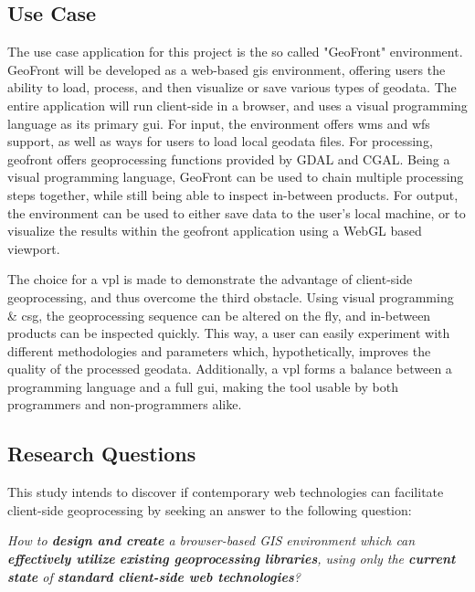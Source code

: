 \subsection{Use Case}

The use case application for this project is the so called "GeoFront" environment. GeoFront will be developed as a web-based \ac{gis} environment, offering users the ability to load, process, and then visualize or save various types of geodata. The entire application will run client-side in a browser, and uses a visual programming language as its primary \ac{gui}.
For input, the environment offers \ac{wms} and \ac{wfs} support, as well as ways for users to load local geodata files.
For processing, geofront offers geoprocessing functions provided by GDAL and CGAL. 
Being a visual programming language, GeoFront can be used to chain multiple processing steps together, while still being able to inspect in-between products. 
For output, the environment can be used to either save data to the user's local machine, or to visualize the results within the geofront application using a WebGL based viewport.

The choice for a \ac{vpl} is made to demonstrate the advantage of client-side geoprocessing, and thus overcome the third obstacle. Using visual programming \& \ac{csg}, the geoprocessing sequence can be altered on the fly, and in-between products can be inspected quickly. This way, a user can easily experiment with different methodologies and parameters which, hypothetically, improves the quality of the processed geodata.
Additionally, a \ac{vpl} forms a balance between a programming language and a full \ac{gui}, making the tool usable by both programmers and non-programmers alike.


\newpage
\subsection{Research Questions}

This study intends to discover if contemporary web technologies can facilitate client-side geoprocessing by seeking an answer to the following question:  

\textit{How to \textbf{design and create} a browser-based GIS environment which can \textbf{effectively utilize} \textbf{existing geoprocessing libraries}, using only the \textbf{current state} of \textbf{standard client-side web technologies}?}

